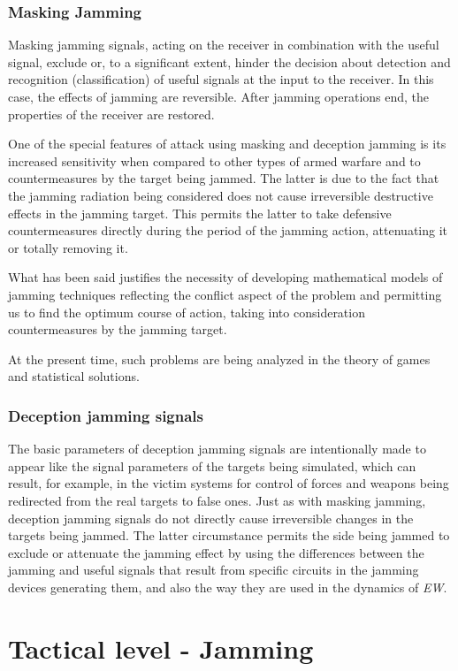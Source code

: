 \documentclass[english,purist]{ist-report}
\begin{document}
\subsubsection{Masking Jamming}
Masking jamming signals, acting on the receiver in combination with
the useful signal, exclude or, to a significant extent, hinder the decision about detection and recognition (classification) of useful signals at the input to the receiver. In this case, the effects of jamming are reversible. After jamming operations end, the properties of the receiver are restored. 

One of the special features of attack using masking and deception
jamming is its increased sensitivity when compared to other types of armed warfare and to countermeasures by the target being jammed. The latter is due to the fact that the jamming radiation being considered does not cause irreversible destructive effects in the jamming target. This permits the latter to take defensive countermeasures directly during the period of the jamming action, attenuating it or totally removing it. 

What has been said justifies the necessity of developing mathematical models of jamming techniques reflecting the conflict aspect of the problem and permitting us to find the optimum course of action, taking into consideration countermeasures by the jamming target.

At the present time, such problems are being analyzed in the theory of
games and statistical solutions. 



\subsubsection{Deception jamming signals}
The basic parameters of deception jamming signals are intentionally
made to appear like the signal parameters of the targets being simulated, which can result, for example, in the victim systems for control of forces and weapons being redirected from the real targets to false ones. Just as with masking jamming, deception jamming signals do not directly cause irreversible changes in the targets being jammed. The latter circumstance permits the side being jammed to exclude or attenuate the jamming effect by using the differences between the jamming and useful signals that result from specific circuits in the jamming devices generating them, and also the way they are used in the dynamics of \textit{EW}.


\section{Tactical level - Jamming}
\end{document}
